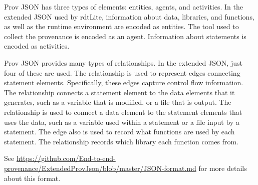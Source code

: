 Prov JSON has three types of elements:  entities, agents, and activities.  In the extended JSON used by rdtLite, information about data, libraries, and functions, as well as the runtime environment are encoded as entities.  The tool used to collect the provenance is encoded as an agent.  Information about statements is encoded as activities.

Prov JSON provides many types of relationships.  In the extended JSON, just four of these are used.  The  relationship is used to represent edges connecting statement elements.  Specifically, these edges capture control flow information.  The  relationship connects a statement element to the data elements that it generates, such as a variable that is modified, or a file that is output.  The  relationship is used to connect a data element to the statement elements that uses the data, such as a variable used within a statement or a file input by a statement.  The  edge also is used to record what functions are used by each statement.  The  relationship records which library each function comes from.

See \url{https://github.com/End-to-end-provenance/ExtendedProvJson/blob/master/JSON-format.md} for more details about this format.




\address{Barbara Lerner\\
  Mount Holyoke College\\
  Computer Science Department \\
  South Hadley, MA  01075\\
  United States of America\\}

\address{Emery Boose\\
  Harvard University\\
  Harvard Forest\\
  Petersham, MA 01366\\
  United States of America\\}

\address{Orenna Brand\\
  Columbia University\\
  New York, NY 10027\\
  United States of America\\}

\address{Aaron M. Ellison\\
  Sound Solutions for Sustainable Science\\
  Boston, MA 02135\\
  United States of America\\}

